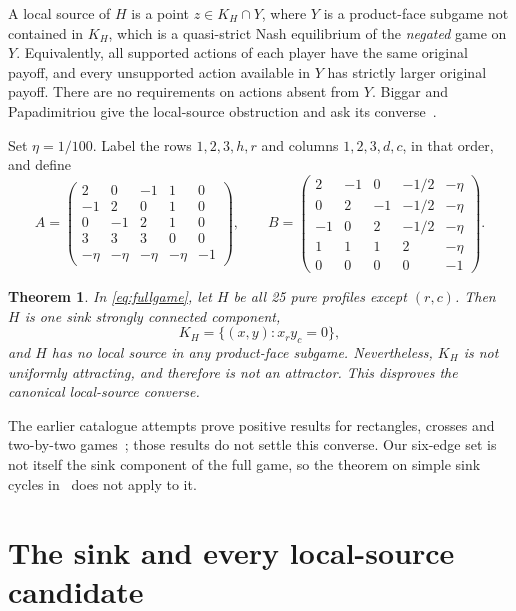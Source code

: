 \documentclass[11pt,a4paper]{article}
\numberwithin{equation}{section}
\newtheorem{theorem}{Theorem}
\theoremstyle{definition}
\begin{document}
A local source of \(H\) is a point \(z\in K_H\cap Y\), where \(Y\)
is a product-face subgame not contained in \(K_H\), which is a
quasi-strict Nash equilibrium of the \emph{negated} game on \(Y\).
Equivalently, all supported actions of each player have the same
original payoff, and every unsupported action available in \(Y\) has
strictly larger original payoff. There are no requirements on actions
absent from \(Y\). Biggar and Papadimitriou give the local-source
obstruction and ask its converse~\cite[Definition 2.1, Lemma 2.2,
Section 4]{BP}.

Set \(\eta=1/100\). Label the rows \(1,2,3,h,r\) and columns
\(1,2,3,d,c\), in that order, and define
\begin{equation}\label{eq:fullgame}
 A=\begin{pmatrix}
 2&0&-1&1&0\\
 -1&2&0&1&0\\
 0&-1&2&1&0\\
 3&3&3&0&0\\
 -\eta&-\eta&-\eta&-\eta&-1
 \end{pmatrix},\qquad
 B=\begin{pmatrix}
 2&-1&0&-1/2&-\eta\\
 0&2&-1&-1/2&-\eta\\
 -1&0&2&-1/2&-\eta\\
 1&1&1&2&-\eta\\
 0&0&0&0&-1
 \end{pmatrix}.
\end{equation}

\begin{theorem}\label{thm:main}
In \eqref{eq:fullgame}, let \(H\) be all 25 pure profiles except
\((r,c)\). Then \(H\) is one sink strongly connected component,
\[
 K_H=\{(x,y):x_r y_c=0\},
\]
and \(H\) has no local source in any product-face subgame. Nevertheless,
\(K_H\) is not uniformly attracting, and therefore is not an attractor.
This disproves the canonical local-source converse.
\end{theorem}

The earlier catalogue attempts prove positive results for rectangles,
crosses and two-by-two games~\cite{prior1,prior2}; those results do not
settle this converse. Our six-edge set is not itself the sink component
of the full game, so the theorem on simple sink cycles in~\cite{cycles}
does not apply to it.

\section{The sink and every local-source candidate}\label{sec:sources}
\end{document}

